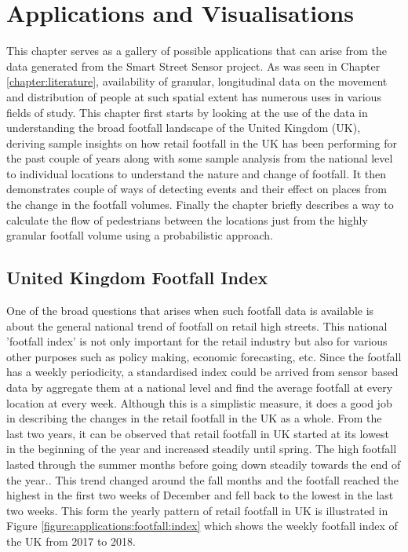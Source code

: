 \chapter{Applications and Visualisations} \label{chapter:application}
This chapter serves as a gallery of possible applications that can arise from the data generated from the Smart Street Sensor project. 
As was  seen in Chapter \ref{chapter:literature}, availability of granular, longitudinal data on the movement and distribution of people at such spatial extent has numerous uses in various fields of study. 
This chapter first starts by looking at the use of the data in understanding the broad footfall landscape of the United Kingdom (UK), deriving sample insights on how retail footfall in the UK has been performing for the past couple of years along with some sample analysis from the national level to individual locations to understand the nature and change of footfall.
It then demonstrates couple of ways of detecting events and their effect on places from the change in the footfall volumes.
Finally the chapter briefly describes a way to calculate the flow of pedestrians between the locations just from the highly granular footfall volume using a probabilistic approach.

\section{United Kingdom Footfall Index}
One of the broad questions that arises when such footfall data is available is about the general national trend of footfall on retail high streets.
This national 'footfall index' is not only important for the retail industry but also for various other purposes such as policy making, economic forecasting, etc.
Since the footfall has a weekly periodicity, a standardised index could be arrived from sensor based data by aggregate them at a national level and find the average footfall at every location at every week. 
Although this is a simplistic measure, it does a good job in describing the changes in the retail footfall in the UK as a whole.
From the last two years, it can be observed that retail footfall in UK started at its lowest in the beginning of the year and increased steadily until spring.
The high footfall lasted through the summer months before going down steadily towards the end of the year..
This trend changed around the fall months and the footfall reached the highest in the first two weeks of December and fell back to the lowest in the last two weeks.
This form the yearly pattern of retail footfall in UK is illustrated in Figure \ref{figure:applications:footfall:index} which shows the weekly footfall index of the UK from 2017 to 2018. 

